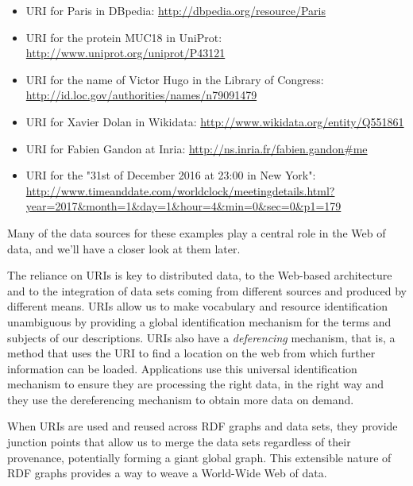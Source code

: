\begin{itemize}
\item
  URI for Paris in DBpedia: \url{http://dbpedia.org/resource/Paris}
\item
  URI for the protein MUC18 in UniProt:
  \url{http://www.uniprot.org/uniprot/P43121}
\item
  URI for the name of Victor Hugo in the Library of Congress:
  \url{http://id.loc.gov/authorities/names/n79091479}
\item
  URI for Xavier Dolan in Wikidata:
  \url{http://www.wikidata.org/entity/Q551861}
\item
  URI for Fabien Gandon at Inria:
  \url{http://ns.inria.fr/fabien.gandon\#me}
\item
  URI for the "31st of December 2016 at 23:00 in New York":
  \url{http://www.timeanddate.com/worldclock/meetingdetails.html?year=2017\&month=1\&day=1\&hour=4\&min=0\&sec=0\&p1=179}
\end{itemize}

Many of the data sources for these examples play a central role in the Web of data, and we'll 
have a closer look at them later. 

The reliance on URIs is key to distributed data,  to the Web-based
architecture and to the integration of data sets coming from different
sources and produced by different means.
URIs  allow us to make  vocabulary and  resource
identification unambiguous by providing a global identification
mechanism for the terms and subjects of our descriptions. URIs also have a 
\emph{deferencing} mechanism, that is, a method that uses the URI to find a location 
on the web from which further information can be loaded. 
Applications use this universal
identification mechanism to ensure they are processing the right data,
in the right way and they use the dereferencing mechanism to obtain more
data on demand.

When URIs are used and reused across RDF graphs and data sets, they
provide junction points that allow us to merge the data sets regardless
of their provenance, potentially forming a  giant global graph. This
extensible nature of RDF graphs provides a way to weave a World-Wide Web
of data.

